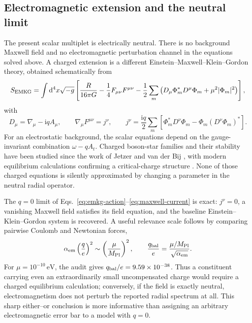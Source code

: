 \documentclass[aps,prd,preprint,onecolumn,nofootinbib,superscriptaddress,showkeys]{revtex4-2}
\newcommand{\dd}{\mathrm{d}}
\newcommand{\ii}{\mathrm{i}}
\begin{document}
\iffalse
\subsection{Electromagnetic extension and the neutral limit}

The present scalar multiplet is electrically neutral. There is no background Maxwell field and no electromagnetic perturbation channel in the equations solved above. A charged extension is a different Einstein--Maxwell--Klein--Gordon theory, obtained schematically from
\begin{equation}
 S_{\rm EMKG}=\int \dd^4x\sqrt{-g}\left[
 \frac{R}{16\pi G}
 -\frac14F_{\mu\nu}F^{\mu\nu}
 -\frac12\sum_m\left(
 D_\mu\Phi_m^*D^\mu\Phi_m+\mu^2|\Phi_m|^2
 \right)\right],
\label{eq:emkg-action}
\end{equation}
with
\begin{equation}
 D_\mu=\nabla_\mu-\ii q A_\mu,
 \qquad
 \nabla_\mu F^{\mu\nu}=j^\nu,
 \qquad
 j^\nu=\frac{\ii q}{2}\sum_m
 \left[\Phi_m^*D^\nu\Phi_m-\Phi_m(D^\nu\Phi_m)^*\right].
\label{eq:maxwell-current}
\end{equation}
For an electrostatic background, the scalar equations depend on the gauge-invariant combination $\omega-qA_t$. Charged boson-star families and their stability have been studied since the work of Jetzer and van der Bij \cite{JetzerVanDerBij1989,JetzerChargedStability1989}, with modern equilibrium calculations confirming a critical-charge structure \cite{LopezAlcubierre2023}. None of those charged equations is silently approximated by changing a parameter in the neutral radial operator.

The $q=0$ limit of Eqs.~\eqref{eq:emkg-action}--\eqref{eq:maxwell-current} is exact: $j^\nu=0$, a vanishing Maxwell field satisfies its field equation, and the baseline Einstein--Klein--Gordon system is recovered. A useful relevance scale follows by comparing pairwise Coulomb and Newtonian forces,
\begin{equation}
 \alpha_{\rm em}\left(\frac{q}{e}\right)^2
 \sim\left(\frac{\mu}{M_{\rm Pl}}\right)^2,
 \qquad
 \frac{q_{\rm bal}}{e}
 =\frac{\mu/M_{\rm Pl}}{\sqrt{\alpha_{\rm em}}}.
\label{eq:charge-balance}
\end{equation}
For $\mu=10^{-10}\,\mathrm{eV}$, the audit gives $q_{\rm bal}/e=9.59\times10^{-38}$. Thus a constituent carrying even an extraordinarily small uncompensated charge would require a charged equilibrium calculation; conversely, if the field is exactly neutral, electromagnetism does not perturb the reported radial spectrum at all. This sharp either--or conclusion is more informative than assigning an arbitrary electromagnetic error bar to a model with $q=0$.
\end{document}
